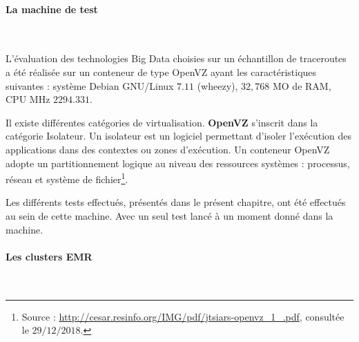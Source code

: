 \paragraph{La machine de test}~

 L'évaluation des technologies Big Data choisies sur un échantillon de traceroutes a été réalisée sur un conteneur de type OpenVZ ayant les caractéristiques suivantes :  système Debian GNU/Linux $ 7.11 $ (wheezy),  $ 32,768 $ MO de  RAM, CPU MHz $ 2294.331 $. 

\begin{tcolorbox}
	Il existe différentes catégories de virtualisation. \textbf{OpenVZ} s'inscrit dans la catégorie Isolateur. Un isolateur est un logiciel permettant d'isoler l'exécution des applications dans des contextes ou zones d'exécution. Un conteneur OpenVZ  adopte un partitionnement logique au niveau des ressources systèmes : processus, réseau et système de fichier\footnote{Source : \url{http://cesar.resinfo.org/IMG/pdf/jtsiars-openvz_1_.pdf}, consultée le $29/12/2018$.}.
\end{tcolorbox}

Les différents tests effectués, présentés dans le présent chapitre, ont été effectués  au sein de cette machine. Avec un seul test  lancé à un moment donné dans la machine.

\paragraph{Les clusters EMR}~


